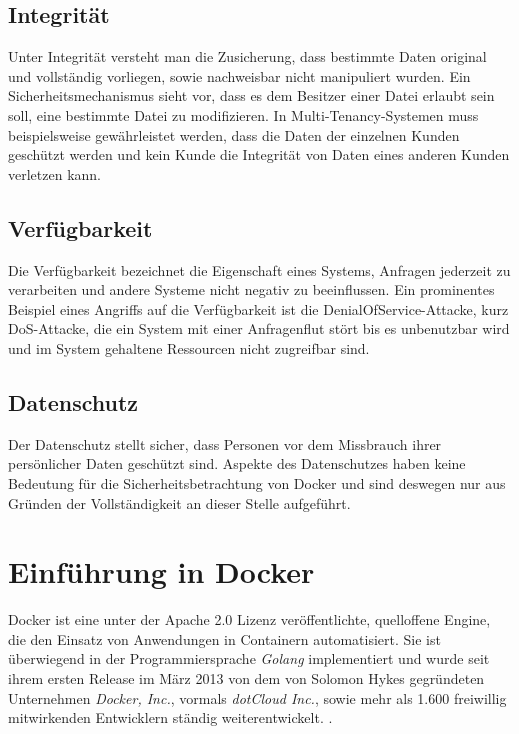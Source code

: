 \documentclass[../main.tex]{subfiles}
\begin{document}
    \subsection{Integrität}
			Unter Integrität versteht man die Zusicherung, dass bestimmte Daten original und vollständig vorliegen, sowie nachweisbar nicht manipuliert wurden. Ein Sicherheitsmechanismus sieht vor, dass es dem Besitzer einer Datei erlaubt sein soll, eine bestimmte Datei zu modifizieren. In Multi-Tenancy-Systemen muss beispielsweise gewährleistet werden, dass die Daten der einzelnen Kunden geschützt werden und kein Kunde die Integrität von Daten eines anderen Kunden verletzen kann.
    \subsection{Verfügbarkeit}
			Die Verfügbarkeit bezeichnet die Eigenschaft eines Systems, Anfragen jederzeit zu verarbeiten und andere Systeme nicht negativ zu beeinflussen. Ein prominentes Beispiel eines Angriffs auf die Verfügbarkeit ist die \gls{DenialOfService}-Attacke, kurz \acrshort{DoS}-Attacke, die ein System mit einer Anfragenflut stört bis es unbenutzbar wird und im System gehaltene Ressourcen nicht zugreifbar sind.
    \subsection{Datenschutz}
			Der Datenschutz stellt sicher, dass Personen vor dem Missbrauch ihrer persönlicher Daten geschützt sind. Aspekte des Datenschutzes haben keine Bedeutung für die Sicherheitsbetrachtung von Docker und sind deswegen nur aus Gründen der Vollständigkeit an dieser Stelle aufgeführt.

  \section{Einführung in Docker}
  \label{dockerIntro}
    Docker ist eine unter der Apache 2.0 Lizenz veröffentlichte, quelloffene Engine, die den Einsatz von Anwendungen in Containern automatisiert. Sie ist überwiegend in der Programmiersprache \emph{Golang} implementiert und wurde seit ihrem ersten Release im März 2013 von dem von Solomon Hykes gegründeten Unternehmen \emph{Docker, Inc.}\cite{dockerHykes}, vormals \emph{dotCloud Inc.}, sowie mehr als 1.600 freiwillig mitwirkenden Entwicklern ständig weiterentwickelt. \cite{githubDocker}\cite[S.7]{dockerBook}\cite{githubDockerChangelog}\cite{dockerCompany}.
\end{document}
